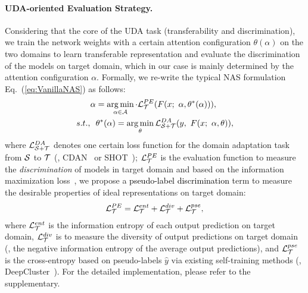 \documentclass[10pt,twocolumn,letterpaper]{article}
\begin{document}
\vspace{-3mm}
\paragraph{UDA-oriented Evaluation Strategy.}


Considering that the core of the UDA task (transferability and discrimination), we train the network weights with a certain attention configuration $\theta(\alpha)$ on the two domains to learn transferable representation and evaluate the discrimination of the models on target domain, which in our case is mainly determined by the attention configuration $\alpha$.
Formally, we re-write the typical NAS formulation Eq.~(\ref{eq:VanillaNAS}) as follows:
\begin{equation}
    \centering
    \begin{split}
        \alpha &= \mathop{\arg \min}_{\alpha \in \sspace} \cdot \mathcal{L}^{PE}_{\Tdomain} (F(x; \  \alpha, \theta^{*}(\alpha))), \\
        s.t., \ \  &\theta^{*}(\alpha) = \mathop{\arg \min}_{\theta} \mathcal{L}^{DA}_{\Sdomain + \Tdomain}(y, \  F(x; \  \alpha, \theta)), \\
    \end{split}
    \label{eq:NAS4UDA}
\end{equation}
where $\mathcal{L}^{DA}_{\mathcal{S} + \mathcal{T}}$ denotes one certain loss function for the domain adaptation task from $\mathcal{S}$ to $\mathcal{T}$ (\eg, CDAN~\cite{long2018CDAN} or SHOT~\cite{liang2020shot}); $\mathcal{L}^{PE}_{\mathcal{T}}$ is the evaluation function to measure the \textit{discrimination} of models in target domain and based on the information maximization loss~\cite{gomes2010discriminative,hu2017learning}, we propose a \textcolor{black}{pseudo-label discrimination} term to measure the desirable properties of ideal representations on target domain:
\begin{equation}
    \begin{split}
        \mathcal{L}^{PE}_{\mathcal{T}} &= \mathcal{L}^{ent}_{\mathcal{T}} + \mathcal{L}^{div}_{\mathcal{T}} + \mathcal{L}^{pse}_{\mathcal{T}}, \\
\end{split}
\end{equation}
where $\mathcal{L}^{ent}_{\mathcal{T}}$ is the information entropy of each output prediction on target domain, $\mathcal{L}^{div}_{\mathcal{T}}$ is to measure the diversity of output predictions on target domain (\eg, the negative information entropy of the average output predictions), and $\mathcal{L}^{pse}_{\mathcal{T}}$ is the cross-entropy based on pseudo-labels $\hat{y}$ via existing self-training methods (\eg, DeepCluster~\cite{caron2018DeepCluster}). For the detailed implementation, please refer to the supplementary.
\end{document}
